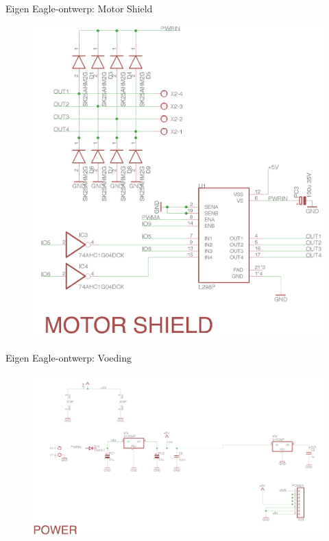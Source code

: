 \documentclass[t,12pt,english
\ifx\beamermode\undefined\else,\beamermode\fi
]{beamer}
\begin{document}
\begin{frame}{Eigen Eagle-ontwerp: Motor Shield}
\begin{figure}[H]
	\centering
	\includegraphics[width=\textwidth,height=0.8\textheight,keepaspectratio]{eigenschematicdeel1.png}
\end{figure}
\end{frame}

\begin{frame}{Eigen Eagle-ontwerp: Voeding}
\begin{figure}[H]
	\centering
	\includegraphics[width=\textwidth,height=0.8\textheight,keepaspectratio]{eigenschematicdeel2.png}
\end{figure}
\end{frame}
\end{document}
